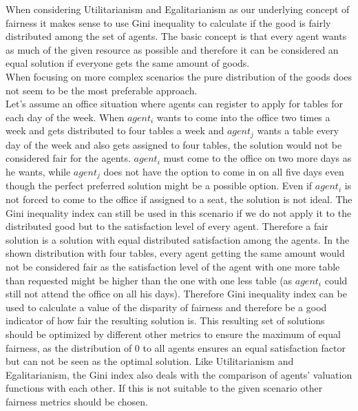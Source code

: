 \documentclass[german, a4paper, 11pt, oneside]{scrbook}
\begin{document}
When considering Utilitarianism and Egalitarianism as our underlying concept of fairness it makes sense to use Gini inequality to calculate if the good is fairly distributed among the set of agents. The basic concept is that every agent wants as much of the given resource as possible and therefore it can be considered an equal solution if everyone gets the same amount of goods. \\When focusing on more complex scenarios the pure distribution of the goods does not seem to be the most preferable approach. \\ Let's assume an office situation where agents can register to apply for tables for each day of the week. When $agent_i$ wants to come into the office two times a week and gets distributed to four tables a week and $agent_j$ wants a table every day of the week and also gets assigned to four tables, the solution would not be considered fair for the agents. $agent_i$ must come to the office on two more days as he wants, while $agent_j$ does not have the option to come in on all five days even though the perfect preferred solution might be a possible option. Even if $agent_i$ is not forced to come to the office if assigned to a seat, the solution is not ideal. The Gini inequality index can still be used in this scenario if we do not apply it to the distributed good but to the satisfaction level of every agent. Therefore a fair solution is a solution with equal distributed satisfaction among the agents. In the shown distribution with four tables, every agent getting the same amount would not be considered fair as the satisfaction level of the agent with one more table than requested might be higher than the one with one less table (as $agent_i$ could still not attend the office on all his days). Therefore Gini inequality index can be used to calculate a value of the disparity of fairness and therefore be a good indicator of how fair the resulting solution is. This resulting set of solutions should be optimized by different other metrics to ensure the maximum of equal fairness, as the distribution of 0 to all agents ensures an equal satisfaction factor but can not be seen as the optimal solution. Like Utilitarianism and Egalitarianism, the Gini index also deals with the comparison of agents' valuation functions with each other. If this is not suitable to the given scenario other fairness metrics should be chosen.
\end{document}
